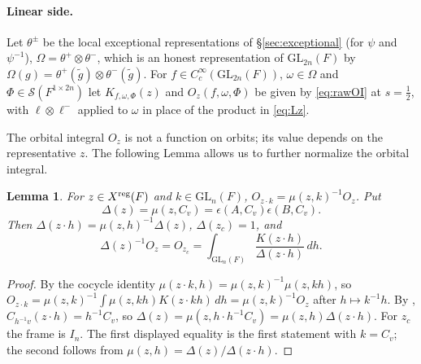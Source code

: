 \documentclass[11pt,oneside,notitlepage]{book}
\numberwithin{equation}{section}
\theoremstyle{plain}
\newtheorem{lemma}[theorem]{Lemma}
\theoremstyle{definition}
\newcommand{\GL}{\mathrm{GL}}
\newcommand{\SO}{\mathrm{SO}}
\newcommand{\Ort}{\mathrm{O}}
\newcommand{\cS}{\mathcal{S}}
\newcommand{\vol}{\operatorname{vol}}
\begin{document}

\paragraph{Linear side.} Let $\theta^\pm$ be the local exceptional representations of \S\ref{sec:exceptional} (for $\psi$ and $\psi^{-1}$), $\Omega=\theta^+\otimes\theta^-$, which is an honest representation of $\GL_{2n}(F)$ by $\Omega(g)=\theta^+(\tilde g)\otimes\theta^-(\tilde g)$. For $f\in C_c^\infty(\GL_{2n}(F))$, $\omega\in\Omega$ and $\Phi\in\cS(F^{1\times 2n})$ let $K_{f,\omega,\Phi}(z)$ and $O_z(f,\omega,\Phi)$ be given by \eqref{eq:rawOI} at $s=\frac12$, with $\ell\otimes\ell^-$ applied to $\omega$ in place of the product in \eqref{eq:Lz}.

The orbital integral $O_z$ is not a function on orbits; its value depends on the representative $z$. The following Lemma allows us to further normalize the orbital integral.
\begin{lemma}\label{lem:equivariance}
For $z\in X^{\rm reg}(F)$ and $k\in\GL_n(F)$, $O_{z\cdot k}=\mu(z,k)^{-1}O_z$. Put
\[\Delta(z)=\mu(z,C_v)=\epsilon(A,C_v)\epsilon(B,C_v).\]
Then $\Delta(z\cdot h)=\mu(z,h)^{-1}\Delta(z)$, $\Delta(z_c)=1$, and
\[\Delta(z)^{-1}O_z=O_{z_c}=\int_{\GL_n(F)}\frac{K(z\cdot h)}{\Delta(z\cdot h)}\,dh .\]
\end{lemma}
\begin{proof}
By the cocycle identity $\mu(z\cdot k,h)=\mu(z,k)^{-1}\mu(z,kh)$, so $O_{z\cdot k}=\mu(z,k)^{-1}\int\mu(z,kh)K(z\cdot kh)\,dh=\mu(z,k)^{-1}O_z$ after $h\mapsto k^{-1}h$. By , $C_{h^{-1}v}(z\cdot h)=h^{-1}C_v$, so $\Delta(z)=\mu(z,h\cdot h^{-1}C_v)=\mu(z,h)\Delta(z\cdot h)$. For $z_c$ the frame is $I_n$. The first displayed equality is the first statement with $k=C_v$; the second follows from $\mu(z,h)=\Delta(z)/\Delta(z\cdot h)$.
\end{proof}
\end{document}
